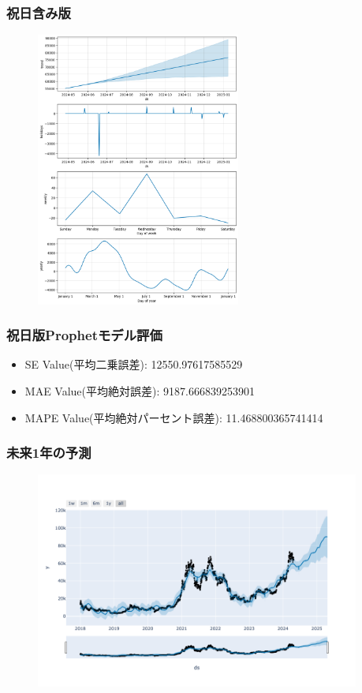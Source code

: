 \documentclass{beamer}  %
\begin{document}
\begin{frame}
    \frametitle{祝日含み版}
    \begin{figure}[htbp]
        \includegraphics[keepaspectratio, width=0.6\textwidth]{pic/pp_fcst2.png}
    \end{figure}
\end{frame}

\begin{frame}
    \frametitle{祝日版Prophetモデル評価}
    \begin{itemize}
        \item SE Value(平均二乗誤差): 12550.97617585529
        \item MAE Value(平均絶対誤差): 9187.666839253901
        \item MAPE Value(平均絶対パーセント誤差): 11.468800365741414
    \end{itemize}
\end{frame}

\begin{frame}
    \frametitle{未来1年の予測}
    \begin{figure}[h]
        \begin{center}
            \includegraphics[keepaspectratio, width=0.95\textwidth]{pic/prophet_all.png}\\
        \end{center}
    \end{figure}
\end{frame}
\end{document}
